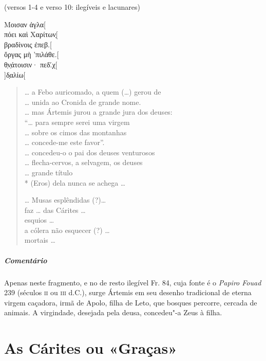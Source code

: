 {\begin{gkverse}
\textnormal{(versos 1-4 e verso 10: ilegíveis e lacunares)}

Μοισαν ἀγλα[\\
πόει καὶ Χαρίτων̣[\\
βραδίνοις ἐπεβ.[\\
ὄργας μὴ ’πιλάθε.[\\
θ̣ν̣άτοισιν· πεδ.́χ[\\
      ]δ̣αλίω[
\end{gkverse}
\pagebreak
\begin{verse}
\ldots{} a Febo auricomado, a quem (\ldots{}) gerou de \\
\ldots{} unida ao Cronida de grande nome.\\
\ldots{} mas Ártemis jurou a grande jura dos deuses:\\
``\ldots{} para sempre serei uma virgem\\
\ldots{} sobre os cimos das montanhas\\
\ldots{} concede-me este favor''.\\
\ldots{} concedeu-o o pai dos deuses venturosos\\
\ldots{} flecha-cervos, a selvagem, os deuses\\
\ldots{} grande título\\*
(Eros) dela nunca se achega \ldots{}

\ast\quad\ast\quad\ast

\ldots{} Musas esplêndidas (?)\ldots{}\\
faz \ldots{} das Cárites \ldots{}\\
esquios \ldots{}\\
a cólera não esquecer (?) \ldots{}\\
mortais \ldots{}
\end{verse}

{\paragraph{Comentário} Apenas neste fragmento, e no de resto ilegível Fr. 84, cuja fonte é o \textit{Papiro Fouad }239 (séculos \textsc{ii} ou
\textsc{iii} d.C.), surge Ártemis em seu desenho tradicional de eterna virgem caçadora,
irmã de Apolo, filha de Leto, que bosques percorre, cercada de animais. A
virgindade, desejada pela deusa, concedeu"-a Zeus à filha.}




\chapter{As Cárites ou «Graças»}

}
